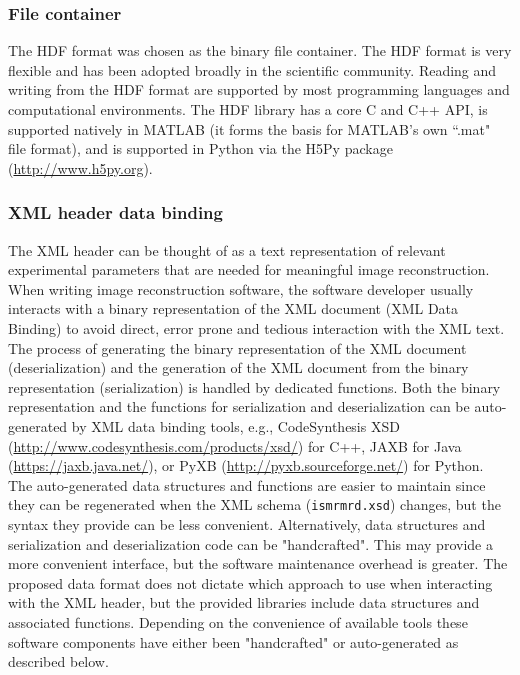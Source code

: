 \documentclass[12pt]{article}
\begin{document}
\subsubsection*{File container}
The HDF format was chosen as the binary file container.  The HDF format is very flexible and has been adopted broadly in the scientific community.  Reading and writing from the HDF format are supported by most programming languages and computational environments.  The HDF library has a core C and C++ API, is supported natively in MATLAB (it forms the basis for MATLAB's own ``.mat" file format), and is supported in Python via the H5Py package (\url{http://www.h5py.org}).

\subsubsection*{XML header data binding}
The XML header can be thought of as a text representation of relevant experimental parameters that are needed for meaningful image reconstruction. When writing image reconstruction software, the software developer usually interacts with a binary representation of the XML document (XML Data Binding) to avoid direct, error prone and tedious interaction with the XML text. The process of generating the binary representation of the XML document (deserialization) and the generation of the XML document from the binary representation (serialization) is handled by dedicated functions. Both the binary representation and the functions for serialization and deserialization can be auto-generated by XML data binding tools, e.g., CodeSynthesis XSD (\url{http://www.codesynthesis.com/products/xsd/}) for C++, JAXB for Java (\url{https://jaxb.java.net/}), or PyXB (\url{http://pyxb.sourceforge.net/}) for Python. The auto-generated data structures and functions are easier to maintain since they can be regenerated when the XML schema (\texttt{ismrmrd.xsd}) changes, but the syntax they provide can be less convenient. Alternatively, data structures and serialization and deserialization code can be "handcrafted". This may provide a more convenient interface, but the software maintenance overhead is greater. The proposed data format does not dictate which approach to use when interacting with the XML header, but the provided libraries include data structures and associated functions. Depending on the convenience of available tools these software components have either been "handcrafted" or auto-generated as described below.  
\end{document}
